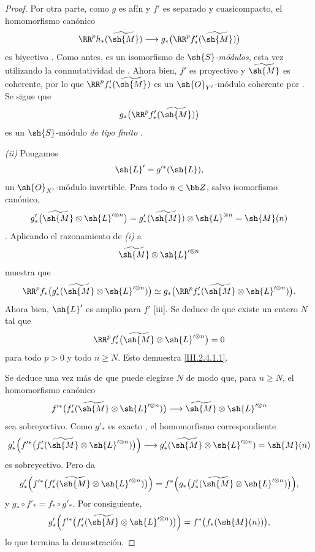 \documentclass[oneside]{amsart}
\renewcommand{\geq}{\geqslant}
\begin{document}
\begin{proof}
Por otra parte, como $g$ es afín y $f'$ es separado y cuasicompacto, el homomorfismo canónico
\[
  \RR^p h_*(\widetilde{\sh{M}})
  \longrightarrow
  g_*\bigl(\RR^p f'_*(\widetilde{\sh{M}})\bigr)
\]
es biyectivo .
Como antes, es un isomorfismo de $\sh{S}$-\emph{módulos}, esta vez utilizando la conmutatividad de .
Ahora bien, $f'$ es proyectivo y $\widetilde{\sh{M}}$ es coherente, por lo que $\RR^p f'_*(\widetilde{\sh{M}})$ es un $\sh{O}_{Y'}$-módulo coherente por .
Se sigue que
\[
  g_*\bigl(\RR^p f'_*(\widetilde{\sh{M}})\bigr)
\]
es un $\sh{S}$-módulo \emph{de tipo finito} .

\emph{(ii)} Pongamos
\[
  \sh{L}'=g'^*(\sh{L}),
\]
un $\sh{O}_{X'}$-módulo invertible.
Para todo $n\in\bb Z$, salvo isomorfismo canónico,
\[
  g'_*\bigl(\widetilde{\sh{M}}\otimes\sh{L}'^{\otimes n}\bigr)
  =
  g'_*(\widetilde{\sh{M}})\otimes\sh{L}^{\otimes n}
  =
  \sh{M}(n)
\]
.
Aplicando el razonamiento de \emph{(i)} a
\[
  \widetilde{\sh{M}}\otimes\sh{L}'^{\otimes n}
\]
muestra que
\[
  \RR^p f_*
  \bigl(g'_*(\widetilde{\sh{M}}\otimes\sh{L}'^{\otimes n})\bigr)
  \simeq
  g_*\bigl(\RR^p f'_*
  (\widetilde{\sh{M}}\otimes\sh{L}'^{\otimes n})\bigr).
\]
Ahora bien, $\sh{L}'$ es amplio para $f'$ [iii].
Se deduce de  que existe un entero $N$ tal que
\[
  \RR^p f'_*
  \bigl(\widetilde{\sh{M}}\otimes\sh{L}'^{\otimes n}\bigr)=0
\]
para todo $p>0$ y todo $n\geq N$.
Esto demuestra \eqref{III.2.4.1.1}.

Se deduce una vez más de  que puede elegirse $N$ de modo que, para $n\geq N$, el homomorfismo canónico
\[
  f'^*\bigl(f'_*(\widetilde{\sh{M}}\otimes\sh{L}'^{\otimes n})\bigr)
  \longrightarrow
  \widetilde{\sh{M}}\otimes\sh{L}'^{\otimes n}
\]
sea sobreyectivo.
Como $g'_*$ es exacto , el homomorfismo correspondiente
\[
  g'_*\Bigl(
    f'^*\bigl(f'_*(\widetilde{\sh{M}}\otimes\sh{L}'^{\otimes n})\bigr)
  \Bigr)
  \longrightarrow
  g'_*(\widetilde{\sh{M}}\otimes\sh{L}'^{\otimes n})
  =\sh{M}(n)
\]
es sobreyectivo.
Pero  da
\[
  g'_*\Bigl(
    f'^*\bigl(f'_*(\widetilde{\sh{M}}\otimes\sh{L}'^{\otimes n})\bigr)
  \Bigr)
  =
  f^*\Bigl(
    g_*\bigl(f'_*(\widetilde{\sh{M}}\otimes\sh{L}'^{\otimes n})\bigr)
  \Bigr),
\]
y $g_*\circ f'_*=f_*\circ g'_*$.
Por consiguiente,
\[
  g'_*\Bigl(
    f'^*\bigl(f'_*(\widetilde{\sh{M}}\otimes\sh{L}'^{\otimes n})\bigr)
  \Bigr)
  =
  f^*\bigl(f_*(\sh{M}(n))\bigr),
\]
lo que termina la demostración.
\end{proof}
\end{document}
